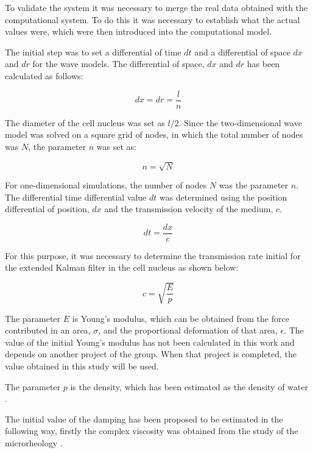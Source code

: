 \documentclass[12pt, a4paper]{article} %
\begin{document}
To validate the system it was necessary to merge the real data obtained with the computational system. To do this it was necessary to establish what the actual values were, which were then introduced into the computational model.

\setlength{\parskip}{4mm}

The initial step was to set a differential of time $dt$ and a differential of space $dx$ and $dr$ for the wave models. The differential of space, $dx$ and $dr$ has been calculated as follows:

\begin{equation} \label{eqn:dx}
	dx = dr = \frac{l}{n}
\end{equation}

The diameter of the cell nucleus was set as $l/2$. Since the two-dimensional wave model was solved on a square grid of nodes, in which the total number of nodes was $N$, the parameter $n$ was set as:

\begin{equation} \label{eqn:n}
	n = \sqrt{N}
\end{equation}

For one-dimensional simulations, the number of nodes $N$ was the parameter $n$. The differential time differential value $dt$ was determined using the position differential of position, $dx$ and the transmission velocity of the medium, $c$.

\begin{equation} \label{eqn:dt}
	dt = \frac{dx}{c}
\end{equation}

For this purpose, it was necessary to determine the transmission rate initial for the extended Kalman filter in the cell nucleus as shown below:

\begin{equation} \label{eqn:c}
	c = \sqrt{\frac{E}{p}}
\end{equation}

The parameter $E$ is Young's modulus, which can be obtained from the force contributed in an area, $\sigma$, and the proportional deformation of that area, $\epsilon$. The value of the initial Young's modulus has not been calculated in this work and depends on another project of the group. When that project is completed, the value obtained in this study will be used.

The parameter $p$ is the density, which has been estimated as the density of water \cite{patterson1994measurement}. 

The initial value of the damping has been proposed to be estimated in the following way, firstly the complex viscosity was obtained from the study of the microrheology \cite{el2008measuring, robertson2018optical}. 
\end{document}
